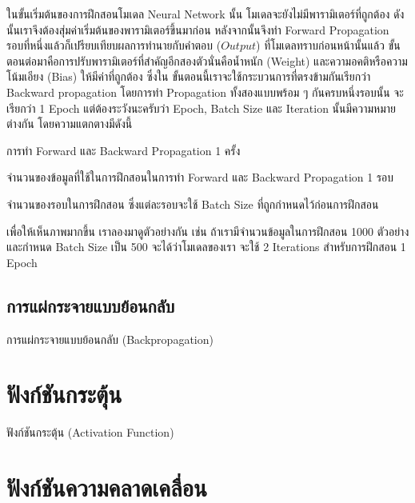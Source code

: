 ในขั้นเริ่มต้นของการฝึกสอนโมเดล Neural Network นั้น โมเดลจะยังไม่มีพารามิเตอร์ที่ถูกต้อง ดังนั้นเราจึงต้องสุ่มค่าเริ่มต้นของพารามิเตอร์ขึ้นมาก่อน
หลังจากนั้นจึงทำ Forward Propagation รอบที่หนึ่งแล้วก็เปรียบเทียบผลการทำนายกับคำตอบ ($Output$) ที่โมเดลทราบก่อนหน้านั้นแล้ว
ขั้นตอนต่อมาคือการปรับพารามิเตอร์ที่สำคัญอีกสองตัวนั่นคือน้ำหนัก (Weight) และความอคติหรือความโน้มเอียง (Bias) ให้มีค่าที่ถูกต้อง ซึ่งใน%
ขั้นตอนนี้เราจะใช้กระบวนการที่ตรงข้ามกันเรียกว่า Backward propagation โดยการทำ Propagation ทั้งสองแบบพร้อม ๆ กันครบหนึ่งรอบนั้น%
จะเรียกว่า 1 Epoch แต่ต้องระวังนะครับว่า Epoch, Batch Size และ Iteration นั้นมีความหมายต่างกัน โดยความแตกตางมีดังนี้

\begin{description}[font=$\bullet$~\normalfont\scshape\bfseries\color{red!50!black}]
    \item[1 Epoch] การทำ Forward และ Backward Propagation 1 ครั้ง
    \item[Batch Size] จำนวนของข้อมูลที่ใช้ในการฝึกสอนในการทำ Forward และ Backward Propagation 1 รอบ
    \item[Iteration] จำนวนของรอบในการฝึกสอน ซึ่งแต่ละรอบจะใช้ Batch Size ที่ถูกกำหนดไว้ก่อนการฝึกสอน
\end{description}

เพื่อให้เห็นภาพมากขึ้น เราลองมาดูตัวอย่างกัน เช่น ถ้าเรามีจำนวนข้อมูลในการฝึกสอน 1000 ตัวอย่างและกำหนด Batch Size เป็น 500 จะได้ว่าโมเดลของเรา%
จะใช้ 2 Iterations สำหรับการฝึกสอน 1 Epoch

\subsection{การแผ่กระจายแบบย้อนกลับ}
\label{sec:backprop}

การแผ่กระจายแบบย้อนกลับ (Backpropagation)

\section{ฟังก์ชันกระตุ้น}
\label{sec:act_func}

ฟังก์ชันกระตุ้น (Activation Function)

\section{ฟังก์ชันความคลาดเคลื่อน}
\label{sec:loss_func}

